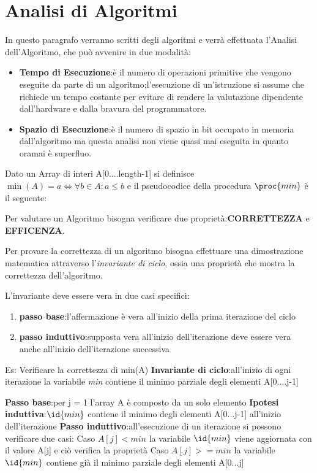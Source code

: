 \section{Analisi di Algoritmi}
In questo paragrafo verranno scritti degli algoritmi e verrà effettuata l'Analisi
dell'Algoritmo, che può avvenire in due modalità:

\begin{itemize}
  \item \textbf{Tempo di Esecuzione}:è il numero di operazioni primitive che vengono eseguite
        da parte di un algoritmo;l'esecuzione di un'istruzione si assume che richiede un tempo costante
        per evitare di rendere la valutazione dipendente dall'hardware e dalla bravura del programmatore.
  \item \textbf{Spazio di Esecuzione}:è il numero di spazio in bit occupato in memoria dall'algoritmo
        ma questa analisi non viene quasi mai eseguita in quanto oramai è superfluo.
\end{itemize}

Dato un Array di interi A[0....length-1] si definisce $\min (A) = a \Leftrightarrow \forall b \in A : a \leq b$
e il pseudocodice della procedura $\proc{min}$ è il seguente:



Per valutare un Algoritmo bisogna verificare due proprietà:\textbf{CORRETTEZZA} e
\textbf{EFFICENZA}.

Per provare la correttezza di un algoritmo bisogna effettuare una dimostrazione
matematica attraverso l'\textit{invariante di ciclo}, ossia una proprietà che mostra
la correttezza dell'algoritmo.

L'invariante deve essere vera in due casi specifici:
\begin{enumerate}
  \item \textbf{passo base}:l'affermazione è vera all'inizio della prima iterazione del ciclo
  \item \textbf{passo induttivo}:supposta vera all'inizio dell'iterazione deve essere vera
        anche all'inizio dell'iterazione successiva
\end{enumerate}

Es: Verificare la correttezza di min(A)
\textbf{Invariante di ciclo}:all'inizio di ogni iterazione la variabile \textit{min} contiene
il minimo parziale degli elementi A[0....j-1]

\textbf{Passo base}:per j = 1 l'array A è composto da un solo elemento \newline
\textbf{Ipotesi induttiva}:$\id{min}$ contiene il minimo degli elementi A[0...j-1] all'inizio dell'iterazione\newline
\textbf{Passo induttivo}:all'esecuzione di un iterazione si possono verificare due casi:\newline
Caso $A[j] < min$\newline \newline
      la variabile $\id{min}$ viene aggiornata con il valore A[j] e ciò verifica la proprietà\newline
Caso $A[j] >= min$\newline \newline
      la variabile $\id{min}$ contiene già il minimo parziale degli elementi A[0...j]

